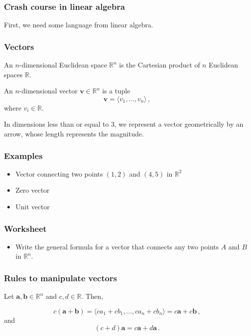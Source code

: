 \documentclass[aspectratio=169]{beamer}
\begin{document}
\begin{frame}
    \frametitle{Crash course in linear algebra}
    First, we need some language from linear algebra. 
\end{frame}

\begin{frame}
    \frametitle{Vectors}

    \begin{definition}
    An \(n\)-dimensional Euclidean space \(\mathbb{R}^n\)
    is the Cartesian product of \(n\) Euclidean spaces \(\mathbb{R}\).
    \end{definition}

    \begin{definition}
    An \(n\)-dimensional vector \(\textbf{v}\in \mathbb{R}^n\) is a tuple
    \begin{equation}
        \textbf{v} = \langle v_1,\dots, v_n \rangle \,,
    \end{equation}
    where \(v_i \in \mathbb{R}\).
    \end{definition}

    In dimensions less than or equal to 3, we represent a vector
    geometrically by an arrow, whose length represents the magnitude.
\end{frame}

\begin{frame}
    \frametitle{Examples}
    \begin{itemize}
        \item Vector connecting two points $(1,2)$ and $(4,5)$ in $\mathbb{R}^2$
        \item Zero vector
        \item Unit vector
    \end{itemize}
\end{frame}

\begin{frame}
    \frametitle{Worksheet}
    \begin{itemize}
        \item Write the general formula for a vector that connects
            any two points $A$ and $B$ in $\mathbb{R}^n$.
    \end{itemize}
\end{frame}


\begin{frame}
    \frametitle{Rules to manipulate vectors}

Let \(\textbf{a}, \textbf{b} \in \mathbb{R}^n\) and \(c,d \in \mathbb{R}\). Then,

\begin{equation*}
    c( \textbf{a} + \textbf{b}) = \langle c a_1 + c b_1, \dots, c a_n + c b_n \rangle  
    = c\textbf{a} + c\textbf{b} \,,
\end{equation*}
and
\begin{equation*}
 (c+d) \textbf{a} = c\mathbf{a} + d\mathbf{a} \,.
\end{equation*}

\end{frame}
\end{document}
